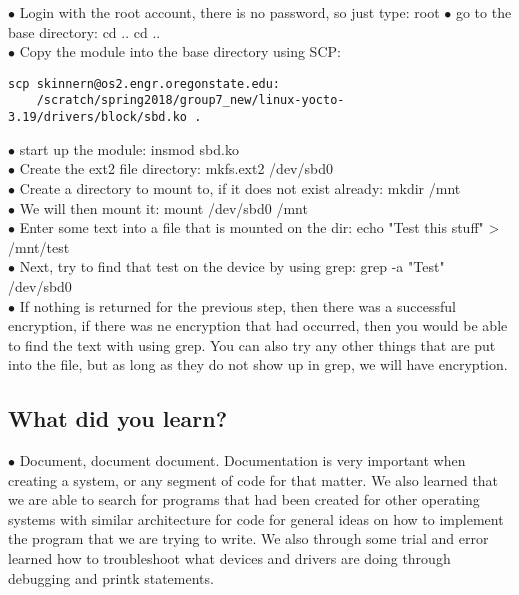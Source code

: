 \documentclass[letterpaper,10pt,fleqn,draftclsnofoot,onecolumn]{IEEEtran}
\begin{document}
	$\bullet$ Login with the root account, there is no password, so just type: root
	$\bullet$ go to the base directory: cd .. cd ..\\
	$\bullet$ Copy the module into the base directory using SCP: \begin{verbatim}scp skinnern@os2.engr.oregonstate.edu:
	/scratch/spring2018/group7_new/linux-yocto-3.19/drivers/block/sbd.ko . \end{verbatim}
	$\bullet$ start up the module: insmod sbd.ko\\
	$\bullet$ Create the ext2 file directory: mkfs.ext2 /dev/sbd0\\
	$\bullet$ Create a directory to mount to, if it does not exist already: mkdir /mnt\\
	$\bullet$ We will then mount it: mount /dev/sbd0 /mnt\\
	$\bullet$ Enter some text into a file that is mounted on the dir: echo "Test this stuff" > /mnt/test\\
	$\bullet$ Next, try to find that test on the device by using grep: grep -a "Test" /dev/sbd0\\
	$\bullet$ If nothing is returned for the previous step, then there was a successful encryption, if there was ne encryption that had occurred, then you would be able to find the text with using grep. You can also try any other things that are put into the file, but as long as they do not show up in grep, we will have encryption.
	
	\subsection{What did you learn?}
	$\bullet$ Document, document document. Documentation is very important when creating a system, or any segment of code for that matter. We also learned that we are able to search for programs that had been created for other operating systems with similar architecture for code for general ideas on how to implement the program that we are trying to write. We also through some trial and error learned how to troubleshoot what devices and drivers are doing through debugging and printk statements.
\end{document}
